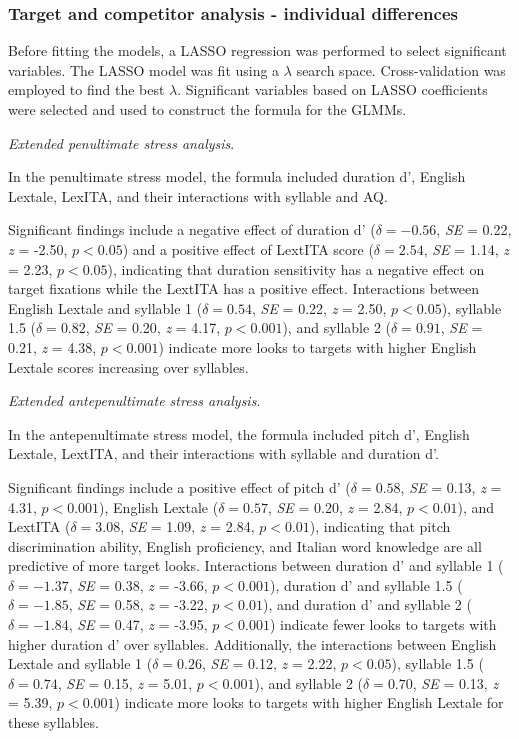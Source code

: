 \subsubsection{Target and competitor analysis - individual differences}

Before fitting the models, a LASSO regression was performed to select significant variables. The LASSO model was fit using a $\lambda$ search space. Cross-validation was employed to find the best $\lambda$. Significant variables based on LASSO coefficients were selected and used to construct the formula for the GLMMs.

\textit{Extended penultimate stress analysis}. 

In the penultimate stress model, the formula included duration d', English Lextale, LexITA, and their interactions with syllable and AQ. 

Significant findings include a negative effect of duration d' ($\delta = -0.56$, \textit{SE} = 0.22, \textit{z} = -2.50, $p < 0.05$) and a positive effect of LextITA score ($\delta = 2.54$, \textit{SE} = 1.14, \textit{z} = 2.23, $p < 0.05$), indicating that duration sensitivity has a negative effect on target fixations while the LextITA has a positive effect. Interactions between English Lextale and syllable 1 ($\delta = 0.54$, \textit{SE} = 0.22, \textit{z} = 2.50, $p < 0.05$), syllable 1.5 ($\delta = 0.82$, \textit{SE} = 0.20, \textit{z} = 4.17, $p < 0.001$), and syllable 2 ($\delta = 0.91$, \textit{SE} = 0.21, \textit{z} = 4.38, $p < 0.001$) indicate more looks to targets with higher English Lextale scores increasing over syllables.

\textit{Extended antepenultimate stress analysis}.

In the antepenultimate stress model, the formula included pitch d', English Lextale, LextITA, and their interactions with syllable and duration d'. 

Significant findings include a positive effect of pitch d' ($\delta = 0.58$, \textit{SE} = 0.13, \textit{z} = 4.31, $p < 0.001$), English Lextale ($\delta = 0.57$, \textit{SE} = 0.20, \textit{z} = 2.84, $p < 0.01$), and LextITA ($\delta = 3.08$, \textit{SE} = 1.09, \textit{z} = 2.84, $p < 0.01$), indicating that pitch discrimination ability, English proficiency, and Italian word knowledge are all predictive of more target looks. Interactions between duration d' and syllable 1 ($\delta = -1.37$, \textit{SE} = 0.38, \textit{z} = -3.66, $p < 0.001$), duration d' and syllable 1.5 ($\delta = -1.85$, \textit{SE} = 0.58, \textit{z} = -3.22, $p < 0.01$), and duration d' and syllable 2 ($\delta = -1.84$, \textit{SE} = 0.47, \textit{z} = -3.95, $p < 0.001$) indicate fewer looks to targets with higher duration d' over syllables. Additionally, the interactions between English Lextale and syllable 1 ($\delta = 0.26$, \textit{SE} = 0.12, \textit{z} = 2.22, $p < 0.05$), syllable 1.5 ($\delta = 0.74$, \textit{SE} = 0.15, \textit{z} = 5.01, $p < 0.001$), and syllable 2 ($\delta = 0.70$, \textit{SE} = 0.13, \textit{z} = 5.39, $p < 0.001$) indicate more looks to targets with higher English Lextale for these syllables. 

